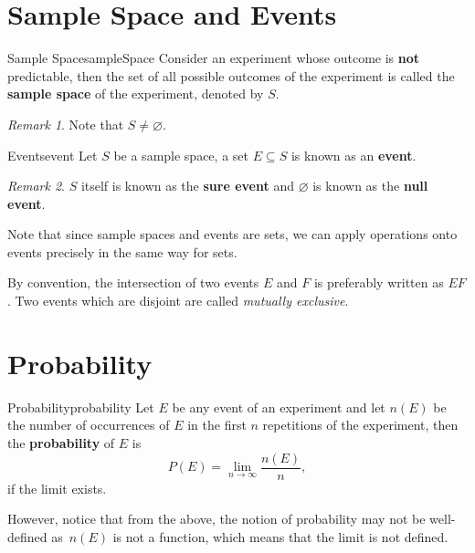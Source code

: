 \documentclass[math]{amznotes}
\theoremstyle{remark}
\newtheorem*{remark}{Remark}
\begin{document}
\section{Sample Space and Events}
\begin{dfnbox}{Sample Space}{sampleSpace}
    Consider an experiment whose outcome is {\color{red} \textbf{not}} predictable, then the set of all possible outcomes of the experiment is called the {\color{red} \textbf{sample space}} of the experiment, denoted by $S$.
\end{dfnbox}
\begin{notebox}
    \begin{remark}
        Note that $S \neq \varnothing$.
    \end{remark}
\end{notebox}
\begin{dfnbox}{Events}{event}
    Let $S$ be a sample space, a set $E \subseteq S$ is known as an {\color{red} \textbf{event}}.
\end{dfnbox}
\begin{notebox}
    \begin{remark}
        $S$ itself is known as the {\color{red} \textbf{sure event}} and $\varnothing$ is known as the {\color{red} \textbf{null event}}.
    \end{remark}
\end{notebox}
Note that since sample spaces and events are sets, we can apply operations onto events precisely in the same way for sets.

By convention, the intersection of two events $E$ and $F$ is preferably written as $EF$. Two events which are disjoint are called \textit{mutually exclusive}.

\section{Probability}
\begin{dfnbox}{Probability}{probability}
    Let $E$ be any event of an experiment and let $n(E)$ be the number of occurrences of $E$ in the first $n$ repetitions of the experiment, then the {\color{red} \textbf{probability}} of $E$ is
    \begin{equation*}
        P(E) = \lim_{n \to \infty}\frac{n(E)}{n},
    \end{equation*}
    if the limit exists.
\end{dfnbox}
However, notice that from the above, the notion of probability may not be well-defined as~$n(E)$ is not a function, which means that the limit is not defined.
\end{document}
